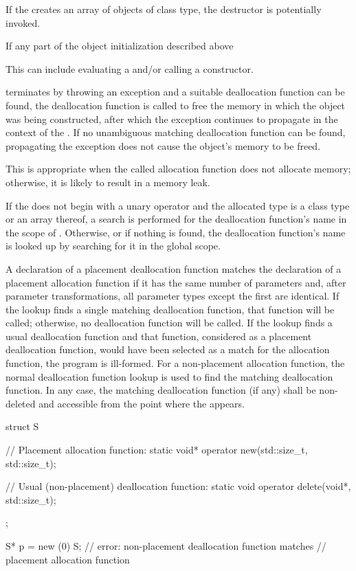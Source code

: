 \pnum
If the 
creates an array of objects of class type, the destructor is potentially
invoked.

\pnum
{}%
If any part of the object initialization described above%
\begin{footnote}
This can
include evaluating a  and/or calling
a constructor.
\end{footnote}
terminates by throwing an exception and a suitable deallocation function
can be found, the deallocation function is called to free the memory in
which the object was being constructed, after which the exception
continues to propagate in the context of the .
If no unambiguous matching deallocation function can be found,
propagating the exception does not cause the object's memory to be
freed.
\begin{note}
This is appropriate when the called allocation function does not
allocate memory; otherwise, it is likely to result in a memory leak.
\end{note}

\pnum
If the  does not begin with
a unary \tcode{::} operator and
the allocated type is a class type  or an array thereof,
a search is performed for the deallocation function's name
in the scope of .
Otherwise, or if nothing is found,
the deallocation function's name is looked up by
searching for it in the global scope.

\pnum
A declaration of a placement deallocation function matches the
declaration of a placement allocation function if it has the same number
of parameters and, after parameter transformations, all
parameter types except the first are identical. If
the lookup finds a single matching deallocation function, that function
will be called; otherwise, no deallocation function will be called. If
the lookup finds a usual deallocation
function
and that function,
considered as a placement deallocation function, would have been
selected as a match for the allocation function, the program is
ill-formed. For a non-placement allocation function, the normal deallocation
function lookup is used to find the matching deallocation
function.
In any case,
the matching deallocation function (if any) shall be non-deleted and
accessible from the point where the  appears.
\begin{example}
\begin{codeblock}
struct S {
  // Placement allocation function:
  static void* operator new(std::size_t, std::size_t);

  // Usual (non-placement) deallocation function:
  static void operator delete(void*, std::size_t);
};

S* p = new (0) S;   // error: non-placement deallocation function matches
                    // placement allocation function
\end{codeblock}

\end{example}

